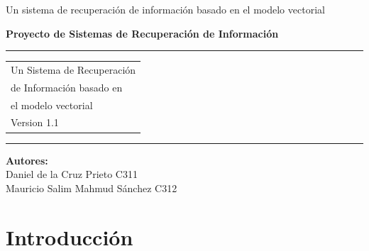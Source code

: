 \documentclass{llncs}
\begin{document}
	{Un sistema de recuperaci\'on de informaci\'on basado en el modelo vectorial}
	\thispagestyle{empty}
	\begin{flushleft}
		\LARGE\bfseries Proyecto de Sistemas de Recuperaci\'on de Informaci\'on\\
		
	\end{flushleft}
	\rule{\textwidth}{1pt}
	\vspace{2pt}
	\begin{flushright}
		\Huge
		\begin{tabular}{@{}l}
			Un Sistema de Recuperaci\'on\\
			de Informaci\'on basado en \\
			el modelo vectorial \\[6pt]
			{\Large Version 1.1}
		\end{tabular}
	\end{flushright}
	\rule{\textwidth}{1pt}
	\vfill
	
	\begin{flushright}
		\textbf{Autores: }\hspace{5cm}\\
		Daniel de la Cruz Prieto C311 \\
		Mauricio Salim Mahmud S\'anchez C312
	\end{flushright}
	\author{Daniel de la Cruz Prieto}
	
	\newpage
	\tableofcontents
	\newpage
	\section{Introducci\'on}
	
\end{document}
